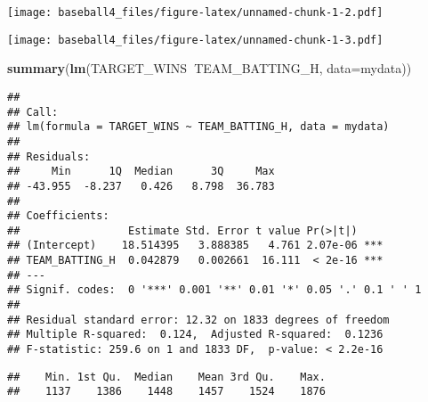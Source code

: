 \documentclass[
]{article}
\newenvironment{Shaded}{\begin{snugshade}}{\end{snugshade}}
\newcommand{\DataTypeTok}[1]{\textcolor[rgb]{0.13,0.29,0.53}{#1}}
\newcommand{\KeywordTok}[1]{\textcolor[rgb]{0.13,0.29,0.53}{\textbf{#1}}}
\newcommand{\NormalTok}[1]{#1}
\newcommand{\OperatorTok}[1]{\textcolor[rgb]{0.81,0.36,0.00}{\textbf{#1}}}
\begin{document}
\texttt{[image: baseball4\_files/figure-latex/unnamed-chunk-1-2.pdf]}

\begin{Shaded}
\end{Shaded}

\texttt{[image: baseball4\_files/figure-latex/unnamed-chunk-1-3.pdf]}

\begin{Shaded}
\begin{Highlighting}[]
\KeywordTok{summary}\NormalTok{(}\KeywordTok{lm}\NormalTok{(TARGET_WINS}\OperatorTok{~}\NormalTok{TEAM_BATTING_H, }\DataTypeTok{data=}\NormalTok{mydata))}
\end{Highlighting}
\end{Shaded}

\begin{verbatim}
## 
## Call:
## lm(formula = TARGET_WINS ~ TEAM_BATTING_H, data = mydata)
## 
## Residuals:
##     Min      1Q  Median      3Q     Max 
## -43.955  -8.237   0.426   8.798  36.783 
## 
## Coefficients:
##                 Estimate Std. Error t value Pr(>|t|)    
## (Intercept)    18.514395   3.888385   4.761 2.07e-06 ***
## TEAM_BATTING_H  0.042879   0.002661  16.111  < 2e-16 ***
## ---
## Signif. codes:  0 '***' 0.001 '**' 0.01 '*' 0.05 '.' 0.1 ' ' 1
## 
## Residual standard error: 12.32 on 1833 degrees of freedom
## Multiple R-squared:  0.124,  Adjusted R-squared:  0.1236 
## F-statistic: 259.6 on 1 and 1833 DF,  p-value: < 2.2e-16
\end{verbatim}

\begin{Shaded}
\end{Shaded}

\begin{verbatim}
##    Min. 1st Qu.  Median    Mean 3rd Qu.    Max. 
##    1137    1386    1448    1457    1524    1876
\end{verbatim}

\begin{Shaded}
\end{Shaded}
\end{document}
